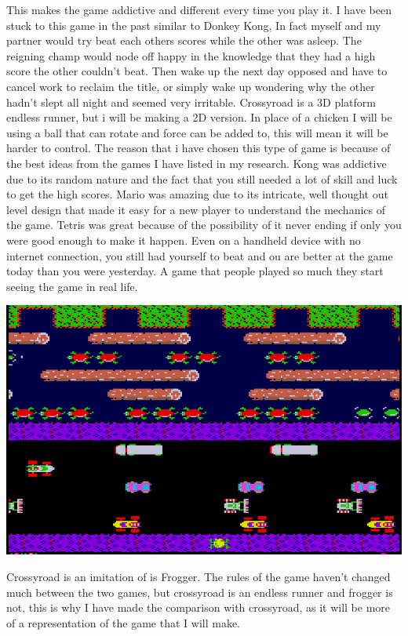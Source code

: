 \documentclass{article}
\begin{document}
This makes the game addictive and different every time you play it. I have been stuck to this game in the past similar to Donkey Kong, In fact myself and my partner would try beat each others scores while the other was asleep. The reigning champ would node off happy in the knowledge that they had a high score the other couldn't beat. Then wake up the next day opposed and have to cancel work to reclaim the title, or simply wake up wondering why the other hadn't slept all night and seemed very irritable. \newline
Crossyroad is a 3D platform endless runner, but i will be making a 2D version. In place of a chicken I will be using a ball that can rotate and force can be added to, this will mean it will be harder to control. The reason that i have chosen this type of game is because of the best ideas from the games I have listed in my research. Kong was addictive due to its random nature and the fact that you still needed a lot of skill and luck to get the high scores. Mario was amazing due to its intricate, well thought out level design that made it easy for a new player to understand the mechanics of the game. Tetris was great because of the possibility of it never ending if only you were good enough to make it happen. Even on a handheld device with no internet connection, you still had yourself to beat and ou are better at the game today than you were yesterday. A game that people played so much they start seeing the game in real life. \newline

\begin{minipage}{0.35\textwidth}
\includegraphics[width=\linewidth]{frogger}
\end{minipage} \hfill
\begin{minipage}{0.55\textwidth}\raggedright
Crossyroad is an imitation of is Frogger. The rules of the game haven't changed much between the two games, but crossyroad is an endless runner and frogger is not, this is why I have made the comparison with crossyroad, as it will be more of a representation of the game that I will make.

\end{minipage} \newline
\end{document}
